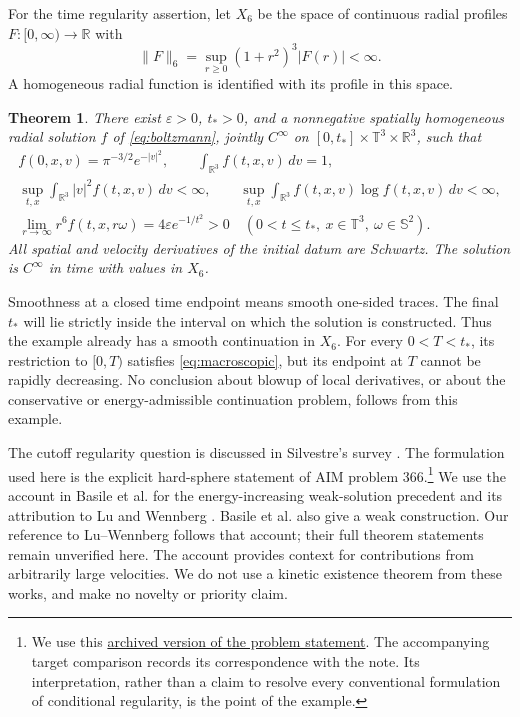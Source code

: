 \documentclass[11pt,a4paper]{article}
\numberwithin{equation}{section}
\newtheorem{theorem}{Theorem}[section]
\theoremstyle{remark}
\newcommand{\R}{\mathbb R}
\newcommand{\T}{\mathbb T}
\newcommand{\Sph}{\mathbb S}
\newcommand{\dd}{\,d}
\newcommand{\norm}[2]{\lVert #1\rVert_{#2}}
\begin{document}
For the time regularity assertion, let \(X_6\) be the space of continuous
radial profiles \(F:[0,\infty)\to\R\) with
\[
 \norm{F}{6}=\sup_{r\geq0}(1+r^2)^3|F(r)|<\infty.
\]
A homogeneous radial function is identified with its profile in this space.

\begin{theorem}\label{thm:construction}
There exist \(\varepsilon>0\), \(t_*>0\), and a nonnegative spatially
homogeneous radial solution \(f\) of \eqref{eq:boltzmann}, jointly
\(C^\infty\) on \([0,t_*]\times\T^3\times\R^3\), such that
\begin{gather}
 f(0,x,v)=\pi^{-3/2}e^{-|v|^2},\qquad
 \int_{\R^3}f(t,x,v)\dd v=1,\label{eq:datum-mass}\\
 \sup_{t,x}\int_{\R^3}|v|^2f(t,x,v)\dd v<\infty,\qquad
 \sup_{t,x}\int_{\R^3}f(t,x,v)\log f(t,x,v)\dd v<\infty,\label{eq:bounds}\\
 \lim_{r\to\infty}r^6f(t,x,r\omega)
       =4\varepsilon e^{-1/t^2}>0
 \quad(0<t\leq t_*,\ x\in\T^3,\ \omega\in\Sph^2).\label{eq:main-tail}
\end{gather}
All spatial and velocity derivatives of the initial datum are Schwartz.
The solution is \(C^\infty\) in time with values in \(X_6\).
\end{theorem}

Smoothness at a closed time endpoint means smooth one-sided traces.
The final \(t_*\) will lie strictly inside the interval on which the
solution is constructed. Thus the example already has a smooth
continuation in \(X_6\). For every \(0<T<t_*\), its restriction to
\([0,T)\) satisfies \eqref{eq:macroscopic}, but its endpoint at \(T\)
cannot be rapidly decreasing. No conclusion about blowup of local
derivatives, or about the conservative or energy-admissible continuation
problem, follows from this example.

The cutoff regularity question is discussed in
Silvestre's survey \cite[Section 8.5]{silvestre}. The formulation used
here is the explicit hard-sphere statement of AIM problem 366.\footnote{We
use this \href{https://github.com/MColbrook/AIM/blob/a153f469ee0ea64e876b2ad97c79d252c19a3e22/problems/366-cutoff-boltzmann-continuation.md}{archived version of the problem statement}.
The accompanying target comparison records its correspondence with the
note. Its interpretation, rather than a
claim to resolve every conventional formulation of conditional
regularity, is the point of the example.}
We use the account in Basile et al. \cite[Sections 1 and 7]{basile}
for the energy-increasing weak-solution precedent and its attribution
to Lu and Wennberg \cite{lu-wennberg}. Basile et al. also give a weak
construction. Our reference to Lu--Wennberg follows that account; their
full theorem statements remain unverified here. The account provides
context for contributions from arbitrarily large velocities. We do not
use a kinetic existence theorem from these works, and make no novelty
or priority claim.
\end{document}
